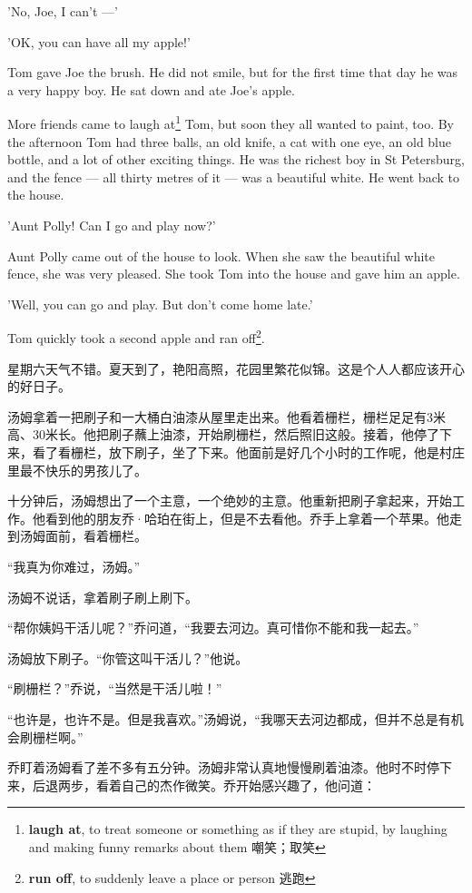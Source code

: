 \documentclass[fontset=ubuntu, zihao=5]{ctexart}
\begin{document}
\begin{paracol}{2}
'No, Joe, I can't —'

'OK, you can have all my apple!'

Tom gave Joe the brush. He did not smile, but for the first time that day he was a very happy boy. He sat down and ate Joe's apple.

More friends came to laugh at\footnote{\textbf{laugh at}, to treat someone or something as if they are stupid, by laughing and making funny remarks about them 嘲笑；取笑} Tom, but soon they all wanted to paint, too. By the afternoon Tom had three balls, an old knife, a cat with one eye, an old blue bottle, and a lot of other exciting things. He was the richest boy in St Petersburg, and the fence — all thirty metres of it — was a beautiful white. He went back to the house.

'Aunt Polly! Can I go and play now?'

Aunt Polly came out of the house to look. When she saw the beautiful white fence, she was very pleased. She took Tom into the house and gave him an apple.

'Well, you can go and play. But don't come home late.'

Tom quickly took a second apple and ran off\footnote{\textbf{run off}, to suddenly leave a place or person 逃跑}.

\switchcolumn

\sectionbreak

星期六天气不错。夏天到了，艳阳高照，花园里繁花似锦。这是个人人都应该开心的好日子。

汤姆拿着一把刷子和一大桶白油漆从屋里走出来。他看着栅栏，栅栏足足有3米高、30米长。他把刷子蘸上油漆，开始刷栅栏，然后照旧这般。接着，他停了下来，看了看栅栏，放下刷子，坐了下来。他面前是好几个小时的工作呢，他是村庄里最不快乐的男孩儿了。

十分钟后，汤姆想出了一个主意，一个绝妙的主意。他重新把刷子拿起来，开始工作。他看到他的朋友乔·哈珀在街上，但是不去看他。乔手上拿着一个苹果。他走到汤姆面前，看着栅栏。

“我真为你难过，汤姆。”

汤姆不说话，拿着刷子刷上刷下。

“帮你姨妈干活儿呢？”乔问道，“我要去河边。真可惜你不能和我一起去。”

汤姆放下刷子。“你管这叫干活儿？”他说。

“刷栅栏？”乔说，“当然是干活儿啦！”

“也许是，也许不是。但是我喜欢。”汤姆说，“我哪天去河边都成，但并不总是有机会刷栅栏啊。”

乔盯着汤姆看了差不多有五分钟。汤姆非常认真地慢慢刷着油漆。他时不时停下来，后退两步，看着自己的杰作微笑。乔开始感兴趣了，他问道：


\end{paracol}
\end{document}
